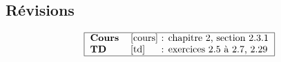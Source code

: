 \subsection{Révisions}

$$\begin{tabular}{|ll@{ : }l|}
\hline
\textbf{Cours} & \cite{cours} & chapitre 2, section 2.3.1 \\
\textbf{TD}    & \cite{td}    & exercices 2.5 à 2.7, 2.29 \\
\hline
\end{tabular}$$
